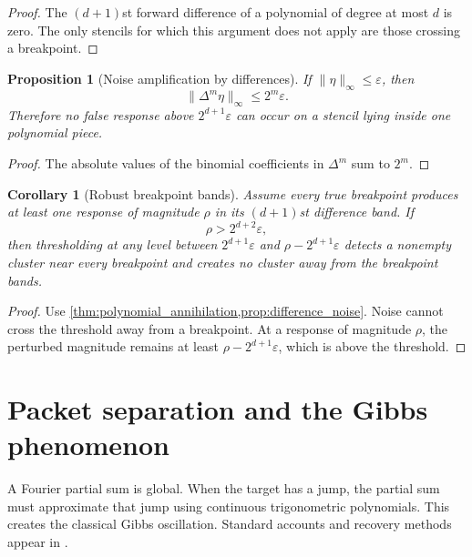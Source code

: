 \documentclass[11pt,letterpaper]{article}
\theoremstyle{plain}
\newtheorem{proposition}[proposition]{Proposition}
\theoremstyle{plain}
\theoremstyle{plain}
\newtheorem{corollary}[corollary]{Corollary}
\theoremstyle{definition}
\theoremstyle{definition}
\theoremstyle{definition}
\theoremstyle{definition}
\theoremstyle{remark}
\theoremstyle{remark}
\theoremstyle{remark}
\theoremstyle{remark}
\begin{document}
\begin{proof}
The \((d+1)\)st forward difference of a polynomial of degree at most \(d\) is zero. The only stencils for which this argument does not apply are those crossing a breakpoint.
\end{proof}

\begin{proposition}[Noise amplification by differences]\label{prop:difference_noise}
If \(\|\eta\|_\infty\leq\varepsilon\), then
\[
\|\Delta^m\eta\|_\infty
\leq
2^m\varepsilon.
\]
Therefore no false response above \(2^{d+1}\varepsilon\) can occur on a stencil lying inside one polynomial piece.
\end{proposition}

\begin{proof}
The absolute values of the binomial coefficients in \(\Delta^m\) sum to \(2^m\).
\end{proof}

\begin{corollary}[Robust breakpoint bands]\label{cor:robust_breakpoint_bands}
Assume every true breakpoint produces at least one response of magnitude \(\rho\) in its \((d+1)\)st difference band. If
\[
\rho>2^{d+2}\varepsilon,
\]
then thresholding at any level between \(2^{d+1}\varepsilon\) and \(\rho-2^{d+1}\varepsilon\) detects a nonempty cluster near every breakpoint and creates no cluster away from the breakpoint bands.
\end{corollary}

\begin{proof}
Use \cref{thm:polynomial_annihilation,prop:difference_noise}. Noise cannot cross the threshold away from a breakpoint. At a response of magnitude \(\rho\), the perturbed magnitude remains at least \(\rho-2^{d+1}\varepsilon\), which is above the threshold.
\end{proof}

\section{Packet separation and the Gibbs phenomenon}\label{extension:section:11}\label{sec:gibbs}

A Fourier partial sum is global. When the target has a jump, the partial sum must approximate that jump using continuous trigonometric polynomials. This creates the classical Gibbs oscillation. Standard accounts and recovery methods appear in \cite{Zygmund2002,GottliebShu1997}.
\end{document}
